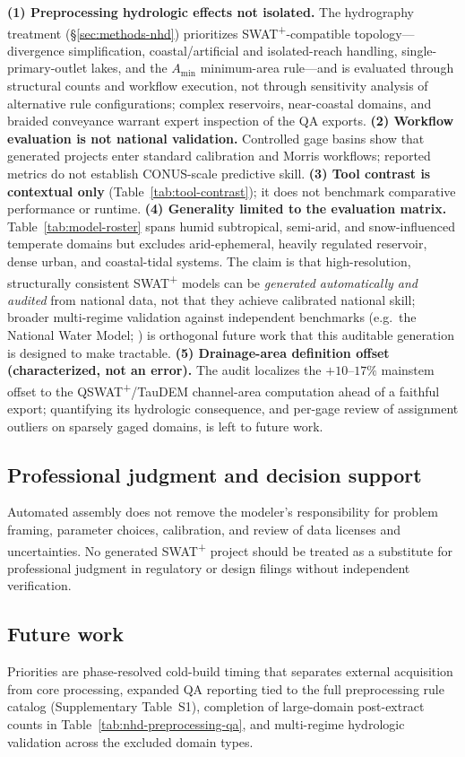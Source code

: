 \textbf{(1) Preprocessing hydrologic effects not isolated.} The hydrography treatment (\S\ref{sec:methods-nhd}) prioritizes SWAT\textsuperscript{+}-compatible topology---divergence simplification, coastal/artificial and isolated-reach handling, single-primary-outlet lakes, and the $A_{\min}$ minimum-area rule---and is evaluated through structural counts and workflow execution, not through sensitivity analysis of alternative rule configurations; complex reservoirs, near-coastal domains, and braided conveyance warrant expert inspection of the QA exports.
\textbf{(2) Workflow evaluation is not national validation.} Controlled gage basins show that generated projects enter standard calibration and Morris workflows; reported metrics do not establish CONUS-scale predictive skill.
\textbf{(3) Tool contrast is contextual only} (Table~\ref{tab:tool-contrast}); it does not benchmark comparative performance or runtime.
\textbf{(4) Generality limited to the evaluation matrix.} Table~\ref{tab:model-roster} spans humid subtropical, semi-arid, and snow-influenced temperate domains but excludes arid-ephemeral, heavily regulated reservoir, dense urban, and coastal-tidal systems. The claim is that high-resolution, structurally consistent SWAT\textsuperscript{+} models can be \emph{generated automatically and audited} from national data, not that they achieve calibrated national skill; broader multi-regime validation against independent benchmarks (e.g.\ the National Water Model; \citealp{Cosgrove2024NWM}) is orthogonal future work that this auditable generation is designed to make tractable.
\textbf{(5) Drainage-area definition offset (characterized, not an error).} The audit localizes the $+10$--$17\%$ mainstem offset to the QSWAT\textsuperscript{+}/TauDEM channel-area computation ahead of a faithful export; quantifying its hydrologic consequence, and per-gage review of assignment outliers on sparsely gaged domains, is left to future work.

\subsection{Professional judgment and decision support}

Automated assembly does not remove the modeler's responsibility for problem framing, parameter choices, calibration, and review of data licenses and uncertainties. No generated SWAT\textsuperscript{+} project should be treated as a substitute for professional judgment in regulatory or design filings without independent verification.

\subsection{Future work}

Priorities are phase-resolved cold-build timing that separates external acquisition from core processing, expanded QA reporting tied to the full preprocessing rule catalog (Supplementary Table~S1), completion of large-domain post-extract counts in Table~\ref{tab:nhd-preprocessing-qa}, and multi-regime hydrologic validation across the excluded domain types.
